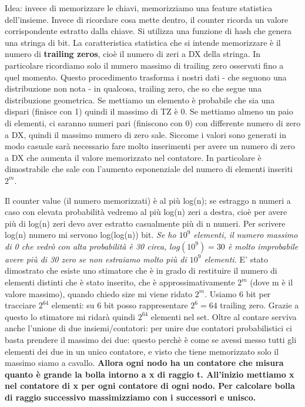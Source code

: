\documentclass[12pt,italian]{report}
\begin{document}
\noindent Idea: invece di memorizzare le chiavi, memorizziamo una feature statistica dell'insieme. Invece di ricordare cosa mette dentro, il counter ricorda un valore corrispondente estratto dalla chiave. 
\bigbreak
Si utilizza una funzione di hash che genera una stringa di bit. La caratteristica statistica che si intende memorizzare è il numero di \textbf{trailing zeros}, cioè il numero di zeri a DX della stringa. In particolare ricordiamo solo il numero massimo di trailing zero osservati fino a quel momento. Questo procedimento trasforma i nostri dati - che seguono una distribuzione non nota - in qualcosa, trailing zero, che so che segue una distribuzione geometrica. 
\bigbreak
Se mettiamo un elemento è probabile che sia una dispari (finisce con 1) quindi il massimo di TZ è 0. Se mettiamo almeno un paio di elementi, ci saranno numeri pari (finiscono con 0) con differente numero di zero a DX, quindi il massimo numero di zero sale. Siccome i valori sono generati in modo casuale sarà necessario fare molto inserimenti per avere un numero di zero a DX che aumenta il valore memorizzato nel contatore. In particolare è dimostrabile che sale con l'aumento esponenziale del numero di elementi inseriti $2^m$.

Il counter value (il numero memorizzati) è al più log(n); se estraggo n numeri a caso con elevata probabilità vedremo al più log(n) zeri a destra, cioè per avere più di log(n) zeri devo aver estratto casualmente più di n numeri. Per scrivere log(n) numero mi servono log(log(n)) bit.
\bigbreak
\textit{Se ho $10^9$ elementi, il numero massimo di 0 che vedrò con alta probabilità è 30 circa, $log(10^9) = 30$ è molto improbabile avere più di 30 zero se non estraiamo molto più di $10^9$ elementi. }
\bigbreak
E' stato dimostrato che esiste uno stimatore che è in grado di restituire il numero di elementi distinti che è stato inserito, che è approssimativamente $2^m$ (dove m è il valore massimo), quando chiedo size mi viene ridato $2^m$.
\bigbreak
Usiamo 6 bit per tracciare $2^64$ elementi: su 6 bit posso rappresentare $2^6 = 64$ trailing zero. Grazie a questo lo stimatore mi ridarà quindi $2^64$ elementi nel set.
\bigbreak
Oltre al contare serviva anche l'unione di due insiemi/contatori: per unire due contatori probabilistici ci basta prendere il massimo dei due: questo perchè è come se avessi messo tutti gli elementi dei due in un unico contatore, e visto che tiene memorizzato solo il massimo siamo a cavallo.
\bigbreak
\textbf{Allora ogni nodo ha un contatore che misura quanto è grande la bolla intorno a x di raggio t. All’inizio mettiamo x nel contatore di x per ogni contatore di ogni nodo. Per calcolare bolla di raggio successivo massimizziamo con i successori e unisco.}
\end{document}
